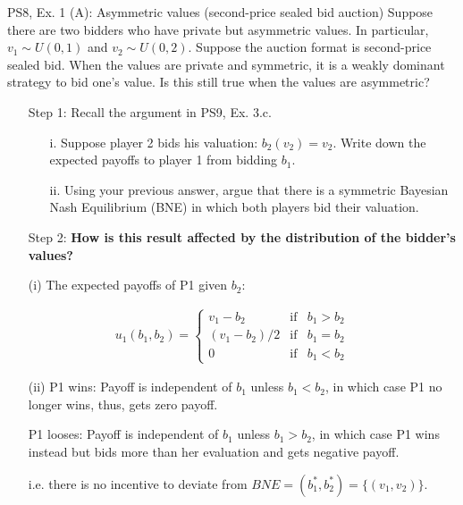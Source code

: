 \begin{frame}{PS8, Ex. 1 (A): Asymmetric values (second-price sealed bid auction)}
    Suppose there are two bidders who have private but asymmetric values. In particular, $v_1\sim U(0, 1)$ and $v_2\sim U(0, 2)$. Suppose the auction format is second-price sealed bid. When the values are private and symmetric, it is a weakly dominant strategy to bid one’s value. Is this still true when the values are asymmetric?
    \begin{multicols}{2}
      \begin{itemize}
        \item[Step 1:] Recall the argument in PS9, Ex. 3.c.
        \begin{itemize}\normalsize
          \item[i.]   Suppose player 2 bids his valuation: $b_2(v_2) = v_2$. Write down the expected payoffs to player 1 from bidding $b_1$.
          \item[ii.]  Using your previous answer, argue that there is a symmetric Bayesian Nash Equilibrium (BNE) in which both players bid their valuation.
        \end{itemize}
        \item[Step 2:] \textbf{How is this result affected by the distribution of the bidder's values?}
      \end{itemize}
      \vfill\null\columnbreak
      \begin{itemize}
        \item[(i)] The expected payoffs of P1 given $b_2$:
      \end{itemize}
      \vspace{-12pt}
      \begin{align*}
        u_1(b_1,b_2)=\left\{\begin{array}{lcl}
          v_1-b_2     & \text{if} & b_1>b_2 \\
          (v_1-b_2)/2 & \text{if} & b_1=b_2 \\
          0           & \text{if} & b_1<b_2
        \end{array}\right.
      \end{align*}
      \vspace{-18pt}
      \begin{itemize}
        \item[(ii)] P1 wins: Payoff is independent of $b_1$ unless $b_1<b_2$, in which case P1 no longer wins, thus, gets zero payoff.
        \item[] P1 looses: Payoff is independent of $b_1$ unless $b_1>b_2$, in which case P1 wins instead but bids more than her evaluation and gets negative payoff.
        \item[] i.e. there is no incentive to deviate from $BNE=(b_1^*,b_2^*)=\{(v_1,v_2)\}$.
      \end{itemize}
      \vfill\null
    \end{multicols}
\end{frame}
